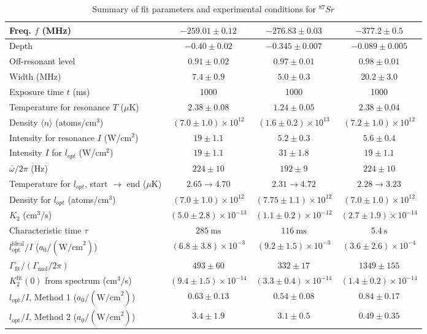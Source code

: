 \begin{table}[htbp]
\centering
\caption{Summary of fit parameters and experimental conditions for $^{87}Sr$}
\label{tab:summary_fits_PA_final}
\small
\renewcommand{\arraystretch}{1.2}
\begin{tabular}{l c c c}
\hline \hline
\textbf{Freq. $f$ (MHz)} & \textbf{$-259.01 \pm 0.12$} & \textbf{$-276.83 \pm 0.03$} & \textbf{$-377.2 \pm 0.5$} \\ 
\hline
Depth & $-0.40 \pm 0.02$ & $-0.345 \pm 0.007$ & $-0.089 \pm 0.005$ \\
Off-resonant level & $0.91 \pm 0.02$ & $0.97 \pm 0.01$ & $0.98 \pm 0.01$ \\
Width (MHz) & $7.4 \pm 0.9$ & $5.0 \pm 0.3$ & $20.2 \pm 3.0$ \\
Exposure time $t$ (ms) & 1000 & 1000 & 1000 \\ 
Temperature for resonance $T$ ($\mu$K) & $2.38\pm0.08$ & $1.24\pm0.05$ & $2.38\pm0.04$ \\
Density $\langle n\rangle$ (atoms/cm$^3$) & $(7.0\pm1.0)\times10^{12}$ & $(1.6\pm0.2)\times10^{13}$ & $(7.2\pm1.0)\times10^{12}$ \\
Intensity for resonance $I$ (W/cm$^2$) & $19\pm1.1$ & $5.2\pm0.3$ & $5.6\pm0.4$ \\
\hline
Intensity $I$ for $l_{opt}$ (W/cm$^2$) & $19\pm1.1$ & $31\pm1.8$ & $19\pm1.1$ \\
$\bar\omega/2\pi$ (Hz) & $224\pm10$ & $192\pm9$ & $224\pm10$ \\
Temperature for $l_{opt}$, start $\to$ end ($\mu$K) & $2.65\to4.70$ & $2.31\to4.72$ & $2.28\to3.23$ \\
Density for $l_{opt}$ (atoms/cm$^3$) & $(7.0\pm1.0)\times10^{12}$ & $(7.75\pm1.1)\times10^{12}$ & $(7.0\pm1.0)\times10^{12}$ \\
$K_2$ (cm$^3$/s) & $(5.0\pm2.8)\times10^{-13}$ & $(1.1\pm0.2)\times10^{-12}$ & $(2.7\pm1.9)\times10^{-14}$ \\
Characteristic time $\tau$ & $285~\text{ms}$ & $116~\text{ms}$ & $5.4~\text{s}$ \\
$l_{\text{opt}}^{\text{ideal}}/I$ ($a_0/(\text{W/cm}^2)$) & $(6.8\pm3.8)\times10^{-3}$ & $(9.2\pm1.5)\times10^{-3}$ & $(3.6\pm2.6)\times10^{-4}$ \\ 
\hline
$\Gamma_{\text{fit}}/(\Gamma_{\text{mol}}/2\pi)$ & $493\pm60$ & $332\pm17$ & $1349\pm155$ \\
$K_2^{\text{fit}}(0)$ from spectrum (cm$^3$/s) & $(9.4\pm1.5)\times10^{-14}$ & $(3.3\pm0.4)\times10^{-14}$ & $(1.4\pm0.2)\times10^{-14}$ \\
$l_{\text{opt}}/I$, Method 1 ($a_0/(\text{W/cm}^2)$) & $0.63\pm0.13$ & $0.54\pm0.08$ & $0.84\pm0.17$ \\
$l_{\text{opt}}/I$, Method 2 ($a_0/(\text{W/cm}^2)$) & $3.4\pm1.9$ & $3.1\pm0.5$ & $0.49\pm0.35$ \\
\hline \hline
\end{tabular}
\end{table}

